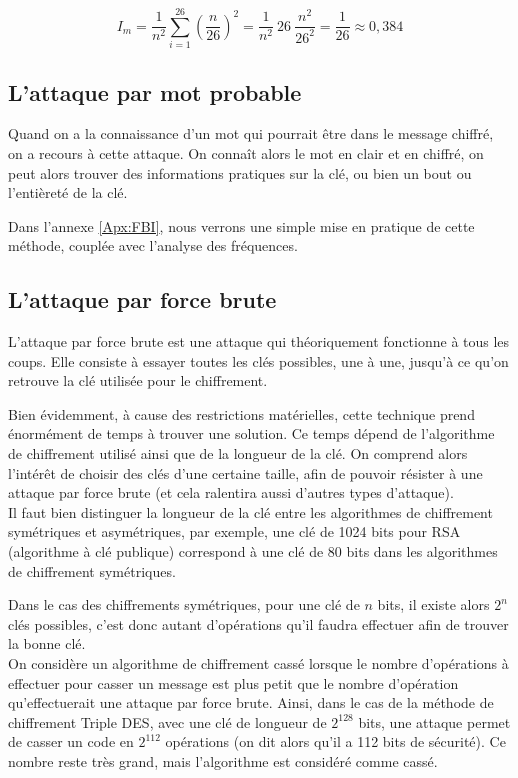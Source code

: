\[I_m = \dfrac{1}{n^2} \sum_{i = 1}^{26} \left(\dfrac{n}{26}\right)^2 =
\dfrac{1}{n^2} ~26~ \dfrac{n^2}{26^2} = \dfrac{1}{26} \approx
0,384\] 

\subsection{L'attaque par mot probable\label{sec:MotProbable}}
Quand on a la connaissance d'un mot qui pourrait être dans le
message chiffré, on a recours à cette attaque. On connaît alors le
mot en clair et en chiffré, on peut alors trouver des informations
pratiques sur la clé, ou bien un bout ou l'entièreté de la clé.

Dans l'annexe \ref{Apx:FBI}, nous verrons une simple mise en pratique
de cette méthode, couplée avec l'analyse des fréquences.

\subsection{L'attaque par force brute}
L'attaque par force brute est une attaque qui théoriquement
fonctionne à tous les coups. Elle consiste à essayer toutes les
clés possibles, une à une, jusqu'à ce qu'on retrouve
la clé utilisée pour le chiffrement.

Bien évidemment, à cause des restrictions matérielles, cette
technique prend énormément de temps à trouver une solution. Ce
temps dépend de l'algorithme de chiffrement utilisé ainsi que de
la longueur de la clé. On comprend alors l'intérêt de choisir des
clés d'une certaine taille, afin de pouvoir résister à une attaque
par force brute (et cela ralentira aussi d'autres types
d'attaque).
\\

Il faut bien distinguer la longueur de la clé entre les
algorithmes de chiffrement symétriques et asymétriques, par
exemple, une clé de 1024 bits pour RSA (algorithme à clé
publique) correspond à une clé de 80 bits dans les algorithmes de
chiffrement symétriques. 

Dans le cas des chiffrements symétriques, pour une clé de $n$
bits, il existe alors $2^n$ clés possibles, c'est donc autant
d'opérations qu'il faudra effectuer afin de trouver la bonne clé. 
\\

On considère un algorithme de chiffrement cassé lorsque le nombre
d'opérations à effectuer pour casser un message est plus
petit que le nombre d'opération qu'effectuerait une attaque par
force brute. Ainsi, dans le cas de la méthode de chiffrement
Triple DES, avec une clé de longueur de $2^{128}$ bits, une
attaque permet de casser un code en $2^{112}$ opérations (on dit
alors qu'il a 112 bits de sécurité). Ce nombre
reste très grand, mais l'algorithme est considéré comme cassé.
\\

